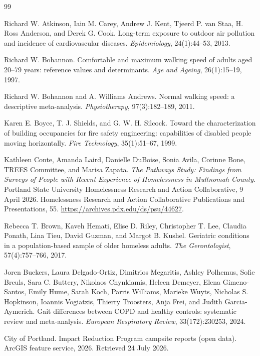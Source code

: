 \documentclass[graybox]{svmult}
\begin{document}
\begin{thebibliography}{99}

Richard W. Atkinson, Iain M. Carey, Andrew J. Kent, Tjeerd P. van Staa, H. Ross
Anderson, and Derek G. Cook. Long-term exposure to outdoor air pollution and
incidence of cardiovascular diseases. \emph{Epidemiology}, 24(1):44--53, 2013.

Richard W. Bohannon. Comfortable and maximum walking speed of adults aged 20--79
years: reference values and determinants. \emph{Age and Ageing}, 26(1):15--19,
1997.

Richard W. Bohannon and A. Williams Andrews. Normal walking speed: a descriptive
meta-analysis. \emph{Physiotherapy}, 97(3):182--189, 2011.

Karen E. Boyce, T. J. Shields, and G. W. H. Silcock. Toward the characterization
of building occupancies for fire safety engineering: capabilities of disabled
people moving horizontally. \emph{Fire Technology}, 35(1):51--67, 1999.

Kathleen Conte, Amanda Laird, Danielle DuBoise, Sonia Avila, Corinne Bone, TREES
Committee, and Marisa Zapata. \emph{The Pathways Study: Findings from Surveys of
People with Recent Experience of Homelessness in Multnomah County}. Portland
State University Homelessness Research and Action Collaborative, 9 April 2026.
Homelessness Research and Action Collaborative Publications and Presentations,
55. \url{https://archives.pdx.edu/ds/psu/44627}.

Rebecca T. Brown, Kaveh Hemati, Elise D. Riley, Christopher T. Lee, Claudia
Ponath, Lina Tieu, David Guzman, and Margot B. Kushel. Geriatric conditions in a
population-based sample of older homeless adults. \emph{The Gerontologist},
57(4):757--766, 2017.

Joren Buekers, Laura Delgado-Ortiz, Dimitrios Megaritis, Ashley Polhemus, Sofie
Breuls, Sara C. Buttery, Nikolaos Chynkiamis, Heleen Demeyer, Elena
Gimeno-Santos, Emily Hume, Sarah Koch, Parris Williams, Marieke Wuyts, Nicholas
S. Hopkinson, Ioannis Vogiatzis, Thierry Troosters, Anja Frei, and Judith
Garcia-Aymerich. Gait differences between COPD and healthy controls: systematic
review and meta-analysis. \emph{European Respiratory Review}, 33(172):230253,
2024.

City of Portland. Impact Reduction Program campsite reports (open data). ArcGIS
feature service, 2026. Retrieved 24 July 2026.


\end{thebibliography}
\end{document}
